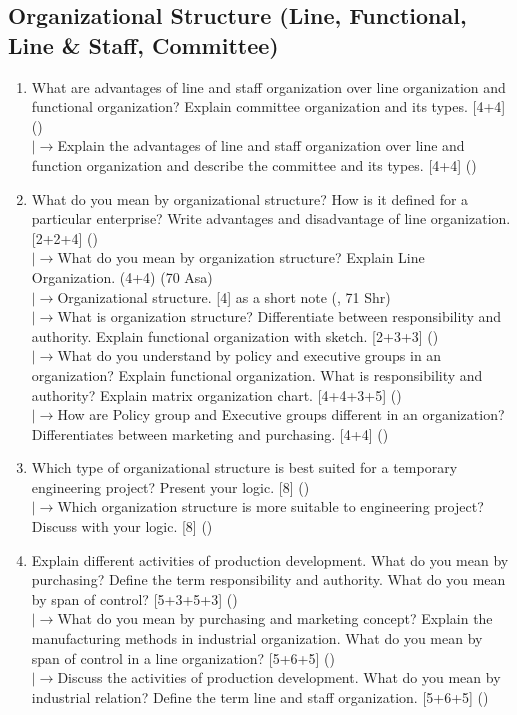 \documentclass[12pt]{article}
\newcommand{\lb}{\\$\left|\rightarrow\right.$}
\begin{document}
  \subsection{Organizational Structure (Line, Functional, Line \& Staff, Committee)}
    \begin{enumerate}[topsep=0pt, noitemsep]
      \item What are advantages of line and staff organization over line organization and functional organization? Explain committee organization and its types. \hfill [4+4] ()
        \lb Explain the advantages of line and staff organization over line and function organization and describe the committee and its types. \hfill [4+4] ()

      \item What do you mean by organizational structure? How is it defined for a particular enterprise? Write advantages and disadvantage of line organization. \hfill [2+2+4] ()
        \lb What do you mean by organization structure? Explain Line Organization. \hfill (4+4) (70 Asa)
        \lb Organizational structure. \hfill [4] as a short note (, 71 Shr)
        \lb What is organization structure? Differentiate between responsibility and authority. Explain functional organization with sketch. \hfill [2+3+3] ()
        \lb What do you understand by policy and executive groups in an organization? Explain functional organization. What is responsibility and authority? Explain matrix organization chart. \hfill [4+4+3+5] ()
        \lb How are Policy group and Executive groups different in an organization? Differentiates between marketing and purchasing. \hfill [4+4] ()

      \item Which type of organizational structure is best suited for a temporary engineering project? Present your logic. \hfill [8] ()
        \lb Which organization structure is more suitable to engineering project? Discuss with your logic. \hfill [8] ()

      \item Explain different activities of production development. What do you mean by purchasing? Define the term responsibility and authority. What do you mean by span of control? \hfill [5+3+5+3] ()
        \lb What do you mean by purchasing and marketing concept? Explain the manufacturing methods in industrial organization. What do you mean by span of control in a line organization? \hfill [5+6+5] ()
        \lb Discuss the activities of production development. What do you mean by industrial relation? Define the term line and staff organization. \hfill [5+6+5] ()
    \end{enumerate}
\end{document}
